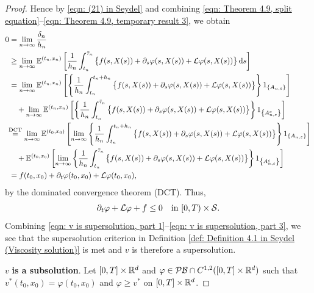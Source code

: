 \begin{proof}
    Hence by \eqref{eqn: (21) in Seydel} and combining \eqref{eqn: Theorem 4.9, split equation}--\eqref{eqn: Theorem 4.9, temporary result 3}, we obtain
    \begin{align*}
        0 &= \lim_{n \rightarrow \infty} \frac{\delta_n}{h_n} \\
        & \geq \lim_{n \rightarrow \infty} \mathbb{E}^{(t_n,x_n)} \left[ \frac{1}{h_n} \int_{t_n}^{\bar \tau_n} \big\{f(s,X(s)) + \partial_s \varphi(s,X(s)) + \mathcal L \varphi(s,X(s))\big\} \,\mathrm{d} s \right] \\
        & = \lim_{n \rightarrow \infty} \mathbb{E}^{(t_n,x_n)} \left[ \left\{ \frac{1}{h_n} \int_{t_n}^{t_n+h_n} \big\{ f(s,X(s)) + \partial_s \varphi(s,X(s)) + \mathcal L \varphi (s,X(s)) \big\} \right\} 1_{\left\{A_{n,\varepsilon}\right\}}\right] \\
        & \quad + \lim_{n \rightarrow \infty} \mathbb{E}^{(t_n,x_n)} \left[ \left\{ \frac{1}{h_n} \int_{t_n}^{\bar \tau_n} \big\{ f(s,X(s)) + \partial_s \varphi(s,X(s)) + \mathcal L \varphi (s,X(s)) \big\} \right\} 1_{\left\{A_{n,\varepsilon}^c\right\}}\right] \\
        &\! \! \overset{\text{DCT}}{=} \lim_{n \rightarrow \infty} \mathbb{E}^{(t_0,x_0)} \left[ \lim_{n \rightarrow \infty} \left\{ \frac{1}{h_n} \int_{t_n}^{t_n+h_n} \big\{ f(s,X(s)) + \partial_s \varphi(s,X(s)) + \mathcal L \varphi (s,X(s)) \big\} \right\} 1_{\left\{A_{n,\varepsilon}\right\}}\right] \\
        & \quad +\mathbb{E}^{(t_0,x_0)} \left[ \lim_{n \rightarrow \infty} \left\{ \frac{1}{h_n} \int_{t_n}^{\bar \tau_n} \big\{ f(s,X(s)) + \partial_s \varphi(s,X(s)) + \mathcal L \varphi (s,X(s)) \big\} \right\} 1_{\left\{A_{n,\varepsilon}^c\right\}}\right] \\
        & = f(t_0,x_0) + \partial_t \varphi(t_0,x_0) + \mathcal L \varphi (t_0,x_0),
    \end{align*}
    by the dominated convergence theorem (DCT). Thus,
    \begin{equation}
        \partial_t \varphi + \mathcal L \varphi + f \leq 0 \quad \text{in } [0,T) \times \mathcal{S}.
        \label{eqn: v is supersolution, part 3}
    \end{equation}
    Combining \eqref{eqn: v is supersolution, part 1}--\eqref{eqn: v is supersolution, part 3}, we see that the supersolution criterion in Definition \ref{def: Definition 4.1 in Seydel (Viscosity solution)} is met and $v$ is therefore a supersolution. 

    $v$ \textbf{is a subsolution}. Let $[0,T] \times \mathbb{R}^d$ and $\varphi \in \mathcal{PB} \cap C^{1,2}([0,T] \times \mathbb{R}^d)$ such that $v^*(t_0,x_0) = \varphi (t_0,x_0)$ and $\varphi \geq v^*$ on $[0,T] \times \mathbb{R}^d$. 


\end{proof}
